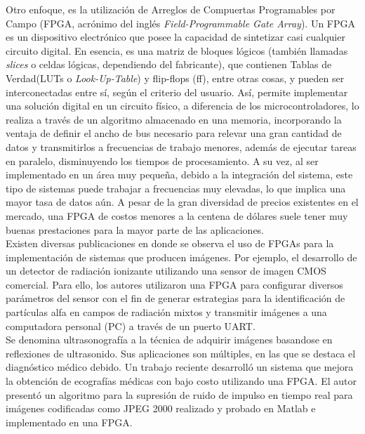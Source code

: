 Otro enfoque, es la utilización de Arreglos de Compuertas Programables por Campo (FPGA, acrónimo del inglés {\it Field-Programmable Gate Array}). Un FPGA es un dispositivo electrónico que posee la capacidad de sintetizar casi cualquier circuito digital. En esencia, es una matriz de bloques lógicos (también llamadas {\it slices} o celdas lógicas, dependiendo del fabricante), que contienen Tablas de Verdad(LUTs o {\it Look-Up-Table}) y flip-flops (ff), entre otras cosas, y pueden ser interconectadas entre sí, según el criterio del usuario. Así, permite implementar una solución digital en un circuito físico, a diferencia de los microcontroladores, lo realiza a través de un algoritmo almacenado en una memoria, incorporando la ventaja de definir el ancho de bus necesario para relevar una gran cantidad de datos y transmitirlos a frecuencias de trabajo menores, además de ejecutar tareas en paralelo, disminuyendo los tiempos de procesamiento. A su vez, al ser implementado en un área muy pequeña, debido a la integración del sistema, este tipo de sistemas puede trabajar a frecuencias muy elevadas, lo que implica una mayor tasa de datos aún. A pesar de la gran diversidad de precios existentes en el mercado, una FPGA de costos menores a la centena de dólares suele tener muy buenas prestaciones para la mayor parte de las aplicaciones.\\

Existen diversas publicaciones en donde se observa el uso de FPGAs para la implementación de sistemas que producen imágenes. Por ejemplo, el desarrollo de un detector de radiación ionizante utilizando una sensor de imagen CMOS comercial. Para ello, los autores utilizaron una FPGA para configurar diversos parámetros del sensor con el fin de generar estrategias para la identificación de partículas alfa en campos de radiación mixtos y transmitir imágenes a una computadora personal (PC) a través de un puerto UART\cite{Perez2017}.\\

Se denomina ultrasonografía a la técnica de adquirir imágenes basandose en reflexiones de ultrasonido. Sus aplicaciones son múltiples, en las que se destaca el diagnóstico médico debido. Un trabajo reciente desarrolló un sistema que mejora la obtención de ecografías médicas con bajo costo utilizando una FPGA\cite{biswas2018embedded}. El autor presentó un algoritmo para la supresión de ruido de impulso en tiempo real para imágenes codificadas como JPEG 2000 realizado y probado en Matlab e implementado en una FPGA.\\

